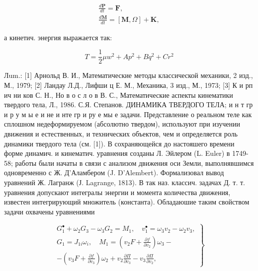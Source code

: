 \documentclass[10pt]{article}
\begin{document}
\[

\begin{gathered}

\frac{d \boldsymbol{P}}{d t}=\boldsymbol{F}, \\

\frac{d \boldsymbol{M}}{d t}=[\boldsymbol{M}, \Omega]+\boldsymbol{K},

\end{gathered}

\]



а кинетич. энергия выражается так:



\[

T=\frac{1}{2} \mu w^{2}+A p^{2}+B q^{2}+C r^{2}

\]



Лum.: [1] Арнольд В. И., Математические методы классической механики, 2 изд., М., 1979; [2] Ландау Л.Д., Лифши ц Е. М., Механика, 3 изд., М., 1973; [3] К и рп ич ни ков С. Н., Но в о с л о в В. С., Математические аспекты кинематики твердого тела, Л., 1986. С.Я. Степанов. ДИНАМИКА ТВЕРДОГО ТЕЛА; и н т гр и р у м ы е и не и нте гр и ру е мы е задачи. Представление о реальном теле как сплошном недеформируемом (абсолютно твердом), используют при изучении движения и естественных, и технических объектов, чем и определяется роль динамики твердого тела (см. [1]). В сохраняющейся до настояшего времени форме динамич. и кинематич. уравнения созданы Л. Эйлером (L. Euler) в 1749-58; работы были начаты в связи с анализом движения оси Земли, выполнявшимся одновременно с Ж. Д'Аламбером (J. D'Alembert). Формализовал вывод уравнений Ж. Лагранж (Ј. Lagrange, 1813). В так наз. классич. задачах Д. т. т. уравнения допускают интегралы энергии и момента количества движения, известен интегрирующий множитель (константа). Обладаюшие таким свойством задачи охвачены уравнениями



\[

\left.\begin{array}{c}

G_{1}^{\bullet}+\omega_{2} G_{3}-\omega_{3} G_{2}=M_{1}, \quad v_{1}^{\bullet}=\omega_{3} v_{2}-\omega_{2} v_{3}, \\

G_{1}=J_{1 i} \omega_{i}, \quad M_{1}=\left(v_{2} F+\frac{\partial f}{\partial v_{2}}\right) \omega_{3}- \\

-\left(v_{3} F+\frac{\partial f}{\partial v_{3}}\right) \omega_{2}+v_{2} \frac{\partial \Pi}{\partial v_{3}}-v_{3} \frac{\partial \Pi}{\partial v_{2}},

\end{array}\right\}

\]
\end{document}
